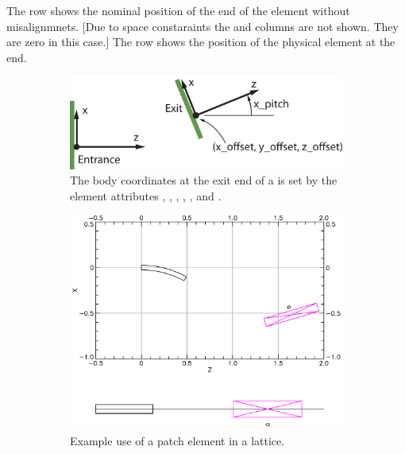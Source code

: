 \documentclass{hitec}
\begin{document}
The  row shows the nominal position of the  end of the element without
misalignmnets. [Due to space constaraints the  and  columns are not shown. They are
zero in this case.] The  row shows the position of the physical element at the  end.

\begin{figure}[tb]
  \centering
  \begin{subfigure}[b]{0.48\textwidth}
    \includegraphics[width=\textwidth]{patch.pdf}
    \caption{The body coordinates at the exit end of a  is set by the element attributes
, , , , , and .}
    \label{f:patch}
  \end{subfigure}
  \hfil
  \begin{subfigure}[b]{0.48\textwidth}
    \includegraphics[width=\textwidth]{patch-example.pdf}
    \caption{Example use of a patch element in a lattice.}
    \label{f:patch.example}
  \end{subfigure}
  \caption{}
\end{figure}
\end{document}
